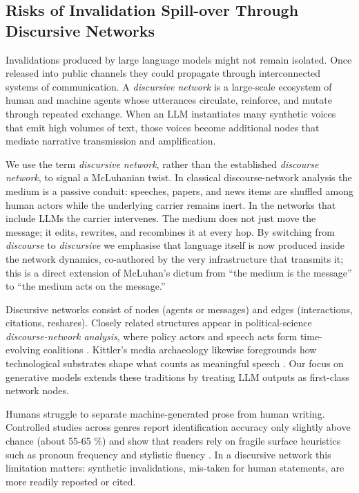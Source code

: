 \documentclass[12pt]{article}
\theoremstyle{definition}
\begin{document}
\subsection{Risks of Invalidation Spill-over Through Discursive Networks}
\label{sec:spillover-discursive-networks}
Invalidations produced by large language models might not remain isolated.
Once released into public channels they could propagate through
interconnected systems of communication.  A
\emph{discursive network} is a large-scale ecosystem of human and
machine agents whose utterances circulate, reinforce, and mutate through
repeated exchange.  When an LLM instantiates many synthetic voices that
emit high volumes of text, those voices become additional nodes that
mediate narrative transmission and amplification.

We use the term \emph{discursive network}, rather than the established \emph{discourse network}, to signal a McLuhanian twist.  In classical discourse-network analysis the medium is a passive conduit: speeches, papers, and news items are shuffled among human actors while the underlying carrier remains inert.  In the networks that include LLMs the carrier intervenes.  The medium does not just move the message; it edits, rewrites, and recombines it at every hop.  By switching from \emph{discourse} to \emph{discursive} we emphasise that language itself is now produced inside the network dynamics, co-authored by the very infrastructure that transmits it; this is a direct extension of McLuhan's dictum from ``the medium is the message'' to ``the medium acts on the message.''

Discursive networks consist of nodes (agents or messages) and edges
(interactions, citations, reshares).  
Closely related structures appear in political-science
\emph{discourse-network analysis}, where policy actors and speech acts
form time-evolving coalitions \parencite{leifeld2014,leifeld2012}.
Kittler's media archaeology likewise foregrounds how technological
substrates shape what counts as meaningful speech
\parencite{kittler1990}.  
Our focus on generative models extends these traditions by treating LLM
outputs as first-class network nodes.

Humans struggle to separate machine-generated prose from human writing.
Controlled studies across genres report identification accuracy only
slightly above chance (about 55-65 \%) and show that readers rely on
fragile surface heuristics such as pronoun frequency and stylistic
fluency \parencite{ippolito2020,DBLP:conf/acl/GehrmannSR19}.  
In a discursive network this limitation matters: synthetic
invalidations, mis-taken for human statements, are more readily reposted
or cited.
\end{document}
